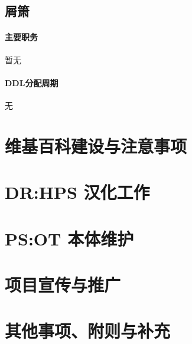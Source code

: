 \documentclass[UTF8, a4paper, 12pt]{ctexart}
\begin{document}
\newpage

\subsection{屑箫}\label{xiexiao}
\paragraph{主要职务} 暂无
\paragraph{DDL分配周期} 无

\newpage
\section{维基百科建设与注意事项}\label{sec3}
\newpage
\section{DR:HPS 汉化工作}\label{sec4}
\newpage
\section{PS:OT 本体维护}\label{sec5}
\newpage
\section{项目宣传与推广}\label{sec6}
\newpage
\section{其他事项、附则与补充}\label{sec7}
\newpage
\end{document}

